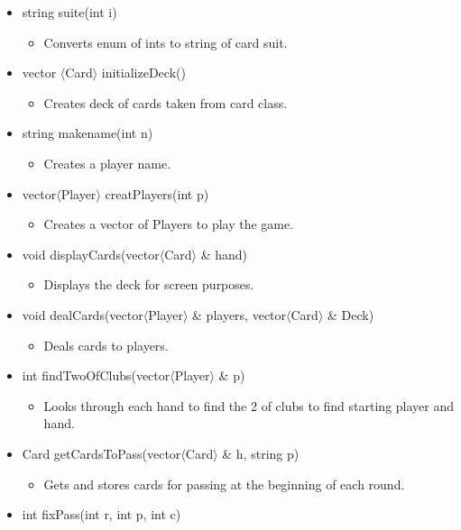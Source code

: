 \documentclass[]{scrartcl}
\begin{document}
	\begin{itemize}
		\item string suite(int i)
			\begin{itemize}
				\item Converts enum of ints to string of card suit.
			\end{itemize}
		\item vector $\langle$Card$\rangle$ initializeDeck()
			\begin{itemize}
				\item Creates deck of cards taken from card class.
			\end{itemize}
		\item string makename(int n)
			\begin{itemize}
				\item 	Creates a player name.
			\end{itemize}
		\item vector$\langle$Player$\rangle$  creatPlayers(int p)
			\begin{itemize}
				\item Creates a vector of Players to play the game.
			\end{itemize}
		\item void displayCards(vector$\langle$Card$\rangle$ \& hand)
			\begin{itemize}
				\item Displays the deck for screen purposes.
			\end{itemize}
		\item void dealCards(vector$\langle$Player$\rangle$ \& players, vector$\langle$Card$\rangle$ \& Deck)
			\begin{itemize}
				\item Deals cards to players.
			\end{itemize}
		\item int findTwoOfClubs(vector$\langle$Player$\rangle$ \& p)
			\begin{itemize}
				\item Looks through each hand to find the 2 of clubs to find starting player and hand.
			\end{itemize}
		\item Card getCardsToPass(vector$\langle$Card$\rangle$ \& h, string p)
			\begin{itemize}
				\item Gets and stores cards for passing at the beginning of each round.
			\end{itemize}
		\item int fixPass(int r, int p, int c)

\end{itemize}
\end{document}
